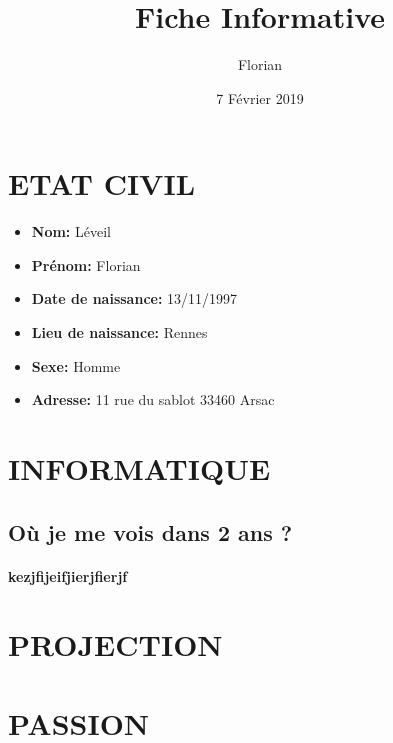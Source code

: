 \documentclass{article}
\title{Fiche Informative}
\author{Florian}
\date{7 Février 2019}
\begin{document}
\maketitle

\section{ETAT CIVIL}
\begin{itemize}
    \item\textbf{Nom:} Léveil
    \item\textbf{Prénom:} Florian
    \item\textbf{Date de naissance:} 13/11/1997
    \item\textbf{Lieu de naissance:} Rennes
    \item\textbf{Sexe:} Homme
    \item\textbf{Adresse:} 11 rue du sablot 33460 Arsac

\end{itemize}

\section{INFORMATIQUE}
\subsection{Où je me vois dans 2 ans ?}

\paragraph{kezjfijeifjierjfierjf}


\section{PROJECTION}

\section{PASSION}
\end{document}
